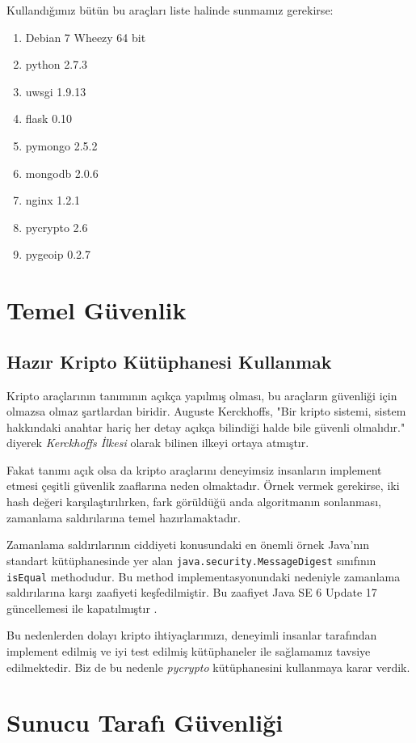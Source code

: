 \documentclass[11pt]{report}
\begin{document}
Kullandığımız bütün bu araçları liste halinde sunmamız gerekirse:

\begin{enumerate}
\item Debian 7 Wheezy 64 bit
\item python 2.7.3
\item uwsgi 1.9.13
\item flask 0.10
\item pymongo 2.5.2
\item mongodb 2.0.6
\item nginx 1.2.1
\item pycrypto 2.6
\item pygeoip 0.2.7
\end{enumerate}


\chapter{Temel Güvenlik}
\section{Hazır Kripto Kütüphanesi Kullanmak}
Kripto araçlarının tanımının açıkça yapılmış olması, bu araçların güvenliği için olmazsa olmaz şartlardan biridir. Auguste Kerckhoffs, "Bir kripto sistemi, sistem hakkındaki anahtar hariç her detay açıkça bilindiği halde bile güvenli olmalıdır."\cite{kerckhoffs} diyerek \emph{Kerckhoffs İlkesi} olarak bilinen ilkeyi ortaya atmıştır.

Fakat tanımı açık olsa da kripto araçlarını deneyimsiz insanların implement etmesi çeşitli güvenlik zaaflarına neden olmaktadır. Örnek vermek gerekirse, iki hash değeri karşılaştırılırken, fark görüldüğü anda algoritmanın sonlanması, zamanlama saldırılarına temel hazırlamaktadır.

Zamanlama saldırılarının ciddiyeti konusundaki en önemli örnek Java'nın standart kütüphanesinde yer alan \texttt{java.security.MessageDigest} sınıfının \texttt{isEqual} methodudur. Bu method implementasyonundaki nedeniyle zamanlama saldırılarına karşı zaafiyeti keşfedilmiştir. Bu zaafiyet Java SE 6 Update 17 güncellemesi ile kapatılmıştır \cite{javavul}.

Bu nedenlerden dolayı kripto ihtiyaçlarımızı, deneyimli insanlar tarafından implement edilmiş ve iyi test edilmiş kütüphaneler ile sağlamamız tavsiye edilmektedir. Biz de bu nedenle \emph{pycrypto} kütüphanesini kullanmaya karar verdik.

\chapter{Sunucu Tarafı Güvenliği}
\end{document}

